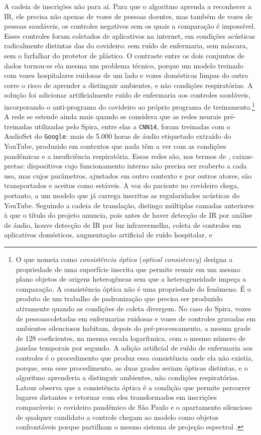 A cadeia de inscrições não para aí. Para que o algoritmo aprenda a reconhecer a IR, ele precisa não apenas de vozes de pessoas doentes, mas também de vozes de pessoas saudáveis, os controles negativos sem os quais a comparação é impossível. Esses controles foram coletados de aplicativos na internet, em condições acústicas radicalmente distintas das do covideiro: sem ruído de enfermaria, sem máscara, sem o farfalhar do protetor de plástico. O contraste entre os dois conjuntos de dados tornou-se ela mesma um problema técnico, porque um modelo treinado com vozes hospitalares ruidosas de um lado e vozes domésticas limpas do outro corre o risco de aprender a distinguir ambientes, e não condições respiratórias. A solução foi adicionar artificialmente ruído de enfermaria aos controles saudáveis, incorporando o anti-programa do covideiro ao próprio programa de treinamento.\footnote{O que \textcite{Latour1986Visualization} nomeia como \textit{consistência óptica} (\textit{optical consistency}) designa a propriedade de uma superfície inscrita que permite reunir em um mesmo plano objetos de origens heterogêneas sem que a heterogeneidade impeça a comparação. A consistência óptica não é uma propriedade do fenômeno. É o produto de um trabalho de padronização que precisa ser produzido ativamente quando as condições de coleta divergem. No caso do Spira, vozes de pessoascoletadas em enfermarias ruidosas e vozes de controles gravadas em ambientes silenciosos habitam, depois do pré-processamento, a mesma grade de 128 coeficientes, na mesma escala logarítmica, com o mesmo número de janelas temporais por segundo. A adição artificial de ruído de enfermaria aos controles é o procedimento que produz essa consistência onde ela não existia, porque, sem esse procedimento, as duas grades seriam ópticas distintas, e o algoritmo aprenderia a distinguir ambientes, não condições respiratórias. Latour observa que a consistência óptica é a condição que permite percorrer lugares distantes e retornar com eles transformados em inscrições comparáveis: o covideiro pandêmico de São Paulo e o apartamento silencioso de qualquer candidato a controle chegam ao modelo como objetos confrontáveis porque partilham o mesmo sistema de projeção espectral \parencite{Latour1986Visualization}.} A rede se estende ainda mais quando se considera que as redes neurais pré-treinadas utilizadas pelo Spira, entre elas a \texttt{CNN14}, foram treinadas com o AudioSet do \texttt{Google}: mais de 5.000 horas de áudio etiquetado extraído do YouTube, produzido em contextos que nada têm a ver com as condições pandêmicas e a insuficiência respiratória. Essas redes são, nos termos de \textcite{Latour2011CienciaEmAcao}, caixas-pretas: dispositivos cujo funcionamento interno não precisa ser reaberto a cada uso, mas cujos parâmetros, ajustados em outro contexto e por outros atores, são transportados e aceitos como estáveis. A voz do paciente no covideiro chega, portanto, a um modelo que já carrega inscritas as regularidades acústicas do YouTube. Seguindo a cadeia de translação, distingo múltiplas camadas anteriores à que o título do projeto anuncia, pois antes de haver detecção de IR por análise de áudio, houve detecção de IR por luz infravermelha, coleta de controles em aplicativos domésticos, augmentação artificial de ruído hospitalar, e 